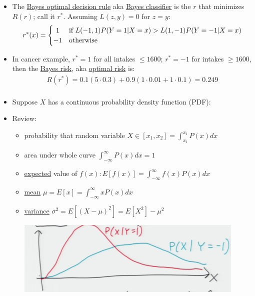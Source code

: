 \documentclass[10pt]{article}
\begin{document}
\begin{description}
\begin{itemize}
\begin{align*}
							+ L(r(x), 1)\frac{P(X=x|Y=-1)(P(Y=-1)}{P(x)})P(x)\\
					&= P(Y=1)\sum_{x} L(r(x), 1)P(X=x|Y=1) +
						P(Y=-1)\sum_{x} L(r(x), -1)P(X=x|Y=-1)\\
			\end{align*}
		\item The \underline{Bayes optimal decision rule} aka \underline{Bayes classifier} is the $r$ that minimizes $R(r)$; call it $r^{*}$. Assuming $L(z, y) = 0$ for $z=y$:
			\[
 				r^{*}(x) = \left\{\def\arraystretch{1.2}%
 					\begin{array}{@{}c@{\quad}l@{}}
    					1 & \text{if $L(-1,1)P(Y=1|X=x) > L(1,-1)P(Y=-1|X=x$)}\\
   						-1 & \text{otherwise}\\
						\end{array}\right.
			\]
		\item In cancer example, $r^{*} = 1$ for all intakes $\leq 1600$; $r^{*} = -1$ for intakes $\geq 1600$, then the \underline{Bayes risk}, aka \underline{optimal risk} is:
		\begin{align*}
			R(r^{*}) = 0.1(5\cdot 0.3) + 0.9(1 \cdot 0.01 + 1 \cdot 0.1) = 0.249\\
		\end{align*}
		\item Suppose $X$ has a continuous probability density function (PDF):
		\item Review:
			\begin{itemize}
				\item probability that random variable
				$X \in [x_{1}, x_{2}] = \int_{x_{1}}^{x_{1}} P(x) dx$\\
				\item area under whole curve $\int_{-\infty}^{\infty} P(x) dx = 1$\\
				\item \underline{expected} value of $f(x): E[f(x)] = \int_{-\infty}^{\infty} f(x)P(x) dx$\\
				\item \underline{mean} $\mu = E[x] = \int_{-\infty}^{\infty} xP(x) dx$\\
				\item \underline{variance} 
					$\sigma^{2} = E[(X-\mu)^{2}] = E[X^{2}] - \mu^{2}$\\
					\begin{center}
						\includegraphics[scale=0.5]{images/gaus}

\end{center}
\end{itemize}
\end{itemize}
\end{description}
\end{document}
